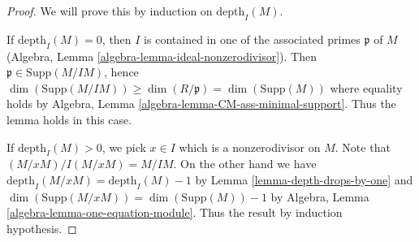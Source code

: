 \documentclass[10pt,a4paper]{amsart}
\theoremstyle{plain}
\theoremstyle{definition}
\theoremstyle{remark}
\numberwithin{equation}{subsection}
\begin{document}
\begin{proof}
We will prove this by induction on $\text{depth}_I(M)$.

\medskip\noindent
If $\text{depth}_I(M) = 0$, then $I$ is contained in one
of the associated primes $\mathfrak p$ of $M$
(Algebra, Lemma \ref{algebra-lemma-ideal-nonzerodivisor}).
Then $\mathfrak p \in \text{Supp}(M/IM)$, hence
$\dim(\text{Supp}(M/IM)) \geq \dim(R/\mathfrak p) = \dim(\text{Supp}(M))$
where equality holds by
Algebra, Lemma \ref{algebra-lemma-CM-ass-minimal-support}.
Thus the lemma holds in this case.

\medskip\noindent
If $\text{depth}_I(M) > 0$, we pick $x \in I$ which is a
nonzerodivisor on $M$. Note that $(M/xM)/I(M/xM) = M/IM$.
On the other hand we have
$\text{depth}_I(M/xM) = \text{depth}_I(M) - 1$
by Lemma \ref{lemma-depth-drops-by-one}
and $\dim(\text{Supp}(M/xM)) = \dim(\text{Supp}(M)) -  1$
by Algebra, Lemma \ref{algebra-lemma-one-equation-module}.
Thus the result by induction hypothesis.
\end{proof}
\end{document}
